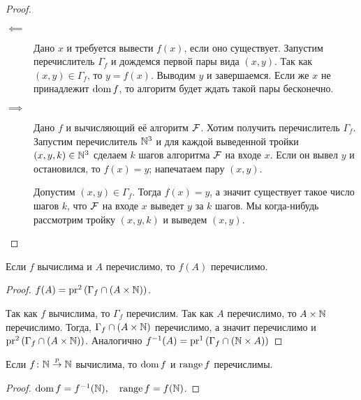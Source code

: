 \begin{proof}~
    \begin{description}
    \item[$\impliedby$]
        Дано $x$ и требуется вывести $f(x)$, если оно существует.
        Запустим перечислитель $\Gamma_f$ и дождемся первой пары вида $(x, y)$.
        Так как $(x, y) \in \Gamma_f$, то $y = f(x)$.
        Выводим $y$ и завершаемся.
        Если же $x$ не принадлежит $\operatorname{dom} f$, то алгоритм будет ждать такой пары бесконечно.

    \item[$\implies$]
        Дано $f$ и вычисляющий её алгоритм $\mathcal{F}$. Хотим получить перечислитель $\Gamma_f$.
        Запустим перечислитель $\mathbb{N}^3$ и для каждой выведенной тройки $(x, y, k) \in \mathbb{N}^3$ сделаем $k$ шагов алгоритма $\mathcal{F}$ на входе $x$.
        Если он вывел $y$ и остановился, то $f(x) = y$; напечатаем пару $(x, y)$.

        Допустим $(x, y) \in \Gamma_f$. Тогда $f(x) = y$, а значит существует такое число шагов $k$, что $\mathcal{F}$ на входе $x$ выведет $y$ за $k$ шагов. Мы когда-нибудь рассмотрим тройку $(x, y, k)$ и выведем $(x, y)$.
        \qedhere
    \end{description}
\end{proof}

\begin{corollary}
    Если $f$ вычислима и $A$ перечислимо, то $f(A)$ перечислимо.
\end{corollary}

\begin{proof}
    $f(A) = \operatorname{pr}^2 \left(\Gamma_f \cap \left(A \times \mathbb{N}\right)\right)$.

    Так как $f$ вычислима, то $\Gamma_f$ перечислим.
    Так как $A$ перечислимо, то $A \times \mathbb{N}$ перечислимо.
    Тогда, $\Gamma_f \cap \left(A \times \mathbb{N}\right)$ перечислимо, а значит перечислимо и $\operatorname{pr}^2\left(\Gamma_f \cap \left(A \times \mathbb{N}\right)\right)$.
    Аналогично $f^{-1}(A) = \operatorname{pr}^{1}\left(\Gamma_f \cap \left(\mathbb{N} \times A\right)\right)$
\end{proof}

\begin{corollary}
    Если $f \colon \mathbb{N} \overset{p}{\to} \mathbb{N}$ вычислима, то $\operatorname{dom} f$ и $\operatorname{range} f$ перечислимы.
\end{corollary}

\begin{proof}
    $\operatorname{dom} f = f^{-1}(\mathbb{N}), \quad \operatorname{range} f = f(\mathbb{N})$.
\end{proof}

